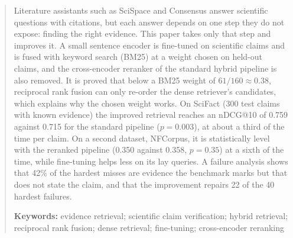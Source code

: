 
\begin{abstract}
\noindent
Literature assistants such as SciSpace and Consensus answer scientific questions with
citations, but each answer depends on one step they do not expose: finding the right
evidence. This paper takes only that step and improves it. A small sentence encoder is
fine-tuned on scientific claims and is fused with keyword search (BM25) at a weight chosen on
held-out claims, and the cross-encoder reranker of the standard hybrid pipeline is also removed.
It is proved that below a BM25 weight of $61/160 \approx 0.38$, reciprocal rank fusion can only
re-order the dense retriever's candidates, which explains why the chosen weight works. On
SciFact (300 test claims with known evidence) the improved retrieval reaches an nDCG@10 of
0.759 against 0.715 for the standard pipeline ($p = 0.003$), at about a third of the time per
claim. On a second dataset, NFCorpus, it is statistically level with the reranked pipeline
(0.350 against 0.358, $p = 0.35$) at a sixth of the time, while fine-tuning helps less on its
lay queries. A failure analysis shows that 42\% of the hardest misses are evidence the
benchmark marks but that does not state the claim, and that the improvement repairs 22 of the
40 hardest failures.

\medskip
\noindent\textbf{Keywords:} evidence retrieval; scientific claim verification; hybrid
retrieval; reciprocal rank fusion; dense retrieval; fine-tuning; cross-encoder reranking
\end{abstract}
